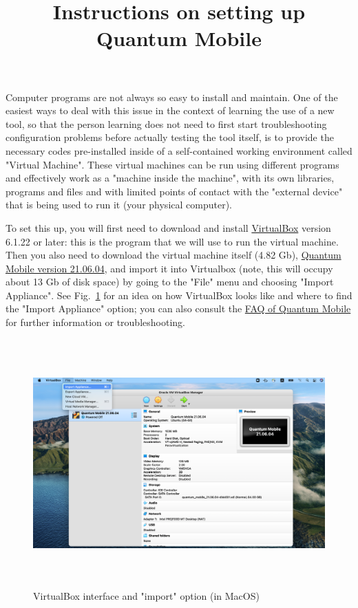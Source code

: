 \documentclass[12pt]{article}
\begin{document}
\title{{\bf Instructions on setting up Quantum Mobile}}

  
\maketitle


\noindent
Computer programs are not always so easy to install and maintain. 
One of the easiest ways to deal with this issue in the context of learning the use
of a new tool, so that the person learning does not need to first start troubleshooting
configuration problems before actually testing the tool itself, is to provide
the necessary codes pre-installed inside of a self-contained working environment
called "Virtual Machine".
These virtual machines can be run using different programs and effectively work
as a "machine inside the machine", with its own libraries, programs and files
and with limited points of contact with the "external device" that is being used
to run it (your physical computer).

\vskip 0.5cm

\noindent
To set this up, you will first need to download and install
\href{https://www.virtualbox.org/}{VirtualBox}
version 6.1.22 or later: this is the program that we will use to run the virtual
machine. Then you also need to download the virtual machine itself (4.82 Gb),
\href{https://drive.google.com/file/d/1Cj7GPmdAOvrv6GYI7XCvEc5SusLCQ4lm/view}
{Quantum Mobile version 21.06.04},
and import it into Virtualbox (note, this will occupy about 13 Gb of disk space) by going to the "File" menu and choosing "Import Appliance".
See Fig.~\ref{import_vm} for an idea on how VirtualBox looks like and where
to find the "Import Appliance" option; you can also consult the
\href{https://github.com/marvel-nccr/quantum-mobile/wiki/Frequently-Asked-Questions}
{FAQ of Quantum Mobile}
for further information or troubleshooting.

\begin{figure}[h!]
\centering
\includegraphics[height=270pt]{import.png}
\caption{VirtualBox interface and "import" option (in MacOS)}
\label{import_vm}
\end{figure}
\end{document}
